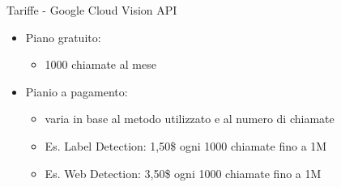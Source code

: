 %
\begin{frame}[t]{Tariffe - Google Cloud Vision API}
\begin{itemize}
	\item Piano gratuito:
	\begin{itemize}
		\item 1000 chiamate al mese
	\end{itemize}
	\item Pianio a pagamento:
	\begin{itemize}
		\item varia in base al metodo utilizzato e al numero di chiamate
		\item Es. \textsf{Label Detection}: 1,50\$ ogni 1000 chiamate fino a 1M
		\item Es. \textsf{Web Detection}: 3,50\$ ogni 1000 chiamate fino a 1M
	\end{itemize}
\end{itemize}
\end{frame}
%
